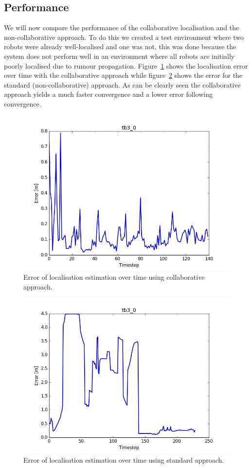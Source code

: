 \documentclass[a4paper, 10pt, conference]{ieeeconf}      %
\begin{document}
\subsection{Performance}
We will now compare the performance of the collaborative localisation and the non-collaborative approach. To do this we created a test environment where two robots were already well-localised and one was not, this was done because the system does not perform well in an environment where all robots are initially poorly localised due to rumour propagation. Figure~\ref{fig:loca1} shows the localisation error over time with the collaborative approach while figure~\ref{fig:loca2} shows the error for the standard (non-collaborative) approach. As can be clearly seen the collaborative approach yields a much faster convergence and a lower error following convergence.
\begin{figure}
	\centering
	\includegraphics[width=0.9\columnwidth]{figure_l1.png}
	\caption{Error of localisation estimation over time using collaborative approach.}
	\label{fig:loca1}
\end{figure}
\begin{figure}
	\centering
	\includegraphics[width=0.9\columnwidth]{figure_l2.png}
	\caption{Error of localisation estimation over time using standard approach.}
	\label{fig:loca2}
\end{figure}
\end{document}
